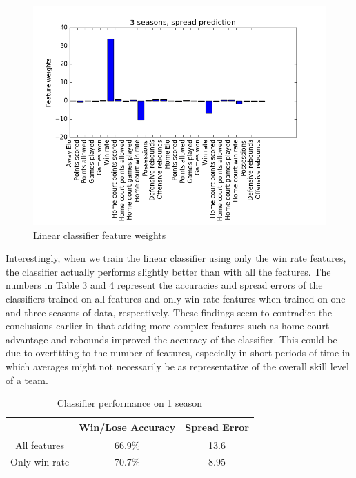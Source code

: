 \documentclass{article}
\begin{document}
\begin{figure}[width=\linewidth]
\begin{multicols}{2}
  \includegraphics[width=1.2\linewidth]{code/figures/3seasons,spreads.png}
\end{multicols}
\caption{Linear classifier feature weights}
\end{figure}

Interestingly, when we train the linear classifier using only the win rate features, the classifier actually performs slightly better than with all the features. The numbers in Table 3 and 4 represent the accuracies and spread errors of the classifiers trained on all features and only win rate features when trained on one and three seasons of data, respectively. These findings seem to contradict the conclusions earlier in that adding more complex features such as home court advantage and rebounds improved the accuracy of the classifier. This could be due to overfitting to the number of features, especially in short periods of time in which averages might not necessarily be as representative of the overall skill level of a team.

\begin{table}
  \begin{center}
    \begin{tabular}{ | c | c | c | }
      \hline
                         & Win/Lose Accuracy & Spread Error  \\ \hline
      All features       & 66.9\%            & 13.6         \\ \hline
      Only win rate      & 70.7\%            & 8.95         \\ \hline
    \end{tabular}
  \end{center}
  \caption{Classifier performance on 1 season}
\end{table}
\end{document}
